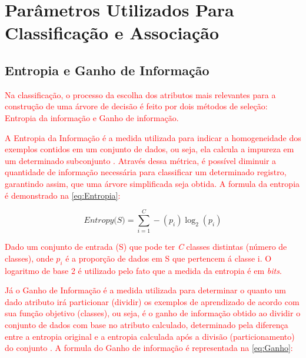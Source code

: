 
\section{Parâmetros Utilizados Para Classificação e Associação}

\subsection{Entropia e Ganho de Informação}

\par
\textcolor{red}{Na classificação, o processo da escolha dos atributos mais relevantes para a construção de uma árvore de decisão é feito por dois métodos de seleção: Entropia da informação e Ganho de informação.}

\par
\textcolor{red}{A Entropia da Informação é a medida utilizada para indicar a homogeneidade dos exemplos contidos em um conjunto de dados, ou seja, ela calcula a impureza em um determinado subconjunto \cite{Carvalho2014}. Através dessa métrica, é possível diminuir a quantidade de informação necessária para classificar um determinado registro, garantindo assim, que uma árvore simplificada seja obtida. A formula da entropia é demonstrado na \autoref{eq:Entropia}:}

\begin{equation}
    \label{eq:Entropia}
        {\textit{Entropy(S)}={\sum_{i=1}^{C} -(p_i)\log_{2}(p_i)}}
\end{equation}

\textcolor{red}{Dado um conjunto de entrada (S) que pode ter \textit{C} classes distintas (número de classes), onde $p_i$ é a proporção de dados em S que pertencem á classe i. O logaritmo de base 2 é utilizado pelo fato que a medida da entropia é em \textit{bits}.}

\par
\textcolor{red}{Já o Ganho de Informação é a medida utilizada para determinar o quanto um dado atributo irá particionar (dividir) os exemplos de aprendizado de acordo com sua função objetivo (classes), ou seja, é o ganho de informação obtido ao dividir o conjunto de dados com base no atributo calculado, determinado pela diferença entre a entropia original e a entropia calculada após a divisão (particionamento) do conjunto \cite{Carvalho2014, Steiner2004}. A formula do Ganho de informação é representada na \autoref{eq:Ganho}:}

